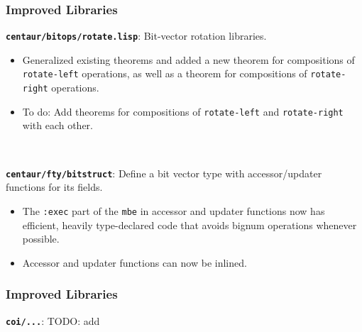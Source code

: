 \documentclass{beamer}
\newcommand{\code}[1]{\texttt{#1}}
\newcommand{\bookpath}[1]{\textbf{\code{#1}}}
\newcommand{\implibtitle}{\frametitle{Improved Libraries}}
\begin{document}
\begin{frame}

\implibtitle

\bookpath{centaur/bitops/rotate.lisp}:
Bit-vector rotation libraries.
\begin{itemize}
\item
Generalized existing theorems and added a new theorem for compositions
of \code{rotate-left} operations, as well as a theorem for
compositions of \code{rotate-right} operations.
\item
To do: Add theorems for compositions of \code{rotate-left} and
\code{rotate-right} with each other.
\end{itemize}

\

\bookpath{centaur/fty/bitstruct}:
Define a bit vector type with accessor/updater functions for its fields.
\begin{itemize}
\item 
The \code{:exec} part of the \code{mbe} in accessor and updater
functions now has efficient, heavily type-declared code that avoids
bignum operations whenever possible.
\item 
Accessor and updater functions can now be inlined.
\end{itemize}

\end{frame}


\begin{frame}

\implibtitle

\bookpath{coi/...}:
TODO: add

\end{frame}

\end{document}
